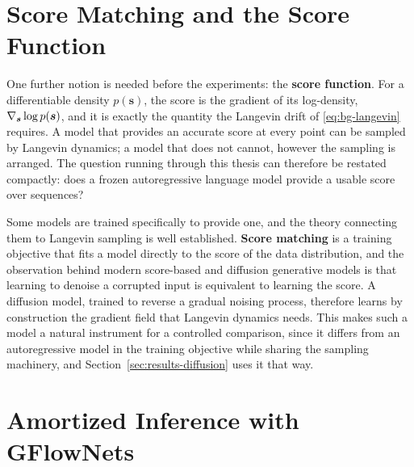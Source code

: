 \section{Score Matching and the Score Function}
\label{sec:bg-score}

One further notion is needed before the experiments: the \textbf{score function}. For a differentiable density $p(\bm{s})$, the score is the gradient of its log-density, $\nabla_{\bm{s}} \log p(\bm{s})$, and it is exactly the quantity the Langevin drift of \eqref{eq:bg-langevin} requires. A model that provides an accurate score at every point can be sampled by Langevin dynamics; a model that does not cannot, however the sampling is arranged. The question running through this thesis can therefore be restated compactly: does a frozen autoregressive language model provide a usable score over sequences?

Some models are trained specifically to provide one, and the theory connecting them to Langevin sampling is well established. \textbf{Score matching} \citep{vincent2011connection} is a training objective that fits a model directly to the score of the data distribution, and the observation behind modern score-based and diffusion generative models \citep{song2019generative, ho2020denoising} is that learning to denoise a corrupted input is equivalent to learning the score. A diffusion model, trained to reverse a gradual noising process, therefore learns by construction the gradient field that Langevin dynamics needs. This makes such a model a natural instrument for a controlled comparison, since it differs from an autoregressive model in the training objective while sharing the sampling machinery, and Section~\ref{sec:results-diffusion} uses it that way.

\section{Amortized Inference with GFlowNets}
\label{sec:bg-gflownet}

